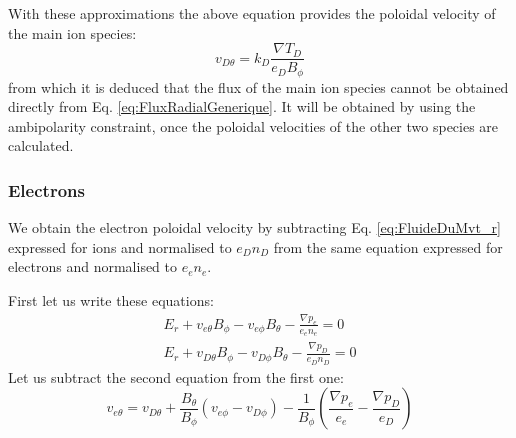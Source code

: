 With these approximations the above equation provides the poloidal velocity of the main ion species:
\begin{equation}
		v_{D\theta} = k_D \frac{\nabla T_D}{e_D B_\phi}
\end{equation}
from which it is deduced that the flux of the main ion species cannot be obtained directly from Eq. \ref{eq:FluxRadialGenerique}. It will be obtained by using the ambipolarity constraint, once the poloidal velocities of the other two species are calculated.



						\subsubsection{Electrons}
						\label{sec:VthetaElectrons}

We obtain the electron poloidal velocity by subtracting Eq. \ref{eq:FluideDuMvt_r} expressed for ions and normalised to $e_D n_D$ from the same equation expressed for electrons and normalised to $e_e n_e$.

First let us write these equations:
\begin{eqnarray}
		E_r + v_{e\theta} B_\phi - v_{e\phi} B_\theta - \frac{\nabla p_e}{e_e n_e} = 0	\nonumber	\\
		E_r + v_{D\theta} B_\phi - v_{D\phi} B_\theta - \frac{\nabla p_D}{e_D n_D} = 0	\nonumber	
\end{eqnarray}
Let us subtract the second equation from the first one:
\begin{equation}
		v_{e\theta} = v_{D\theta} + \frac{B_\theta}{B_\phi}\left( v_{e\phi}-v_{D\phi} \right) - \frac{1}{B_\phi} \left( \frac{\nabla p_e}{e_e} -\frac{\nabla p_D}{e_D} \right)
		\label{eq:VitessePoloidaleElectrons_intermediaire}
\end{equation}

